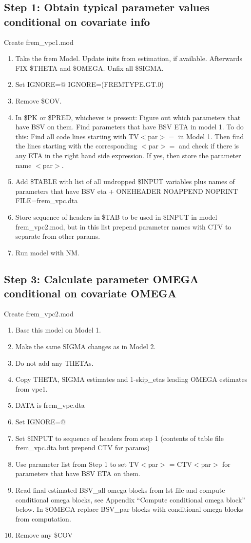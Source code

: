 \subsection{Step 1: Obtain typical parameter values conditional on covariate info}
Create frem\_vpc1.mod

\begin{enumerate}
	\item Take the frem Model. Update inits from estimation, if available. Afterwards FIX \$THETA and \$OMEGA. Unfix all \$SIGMA.
	\item Set IGNORE=@ IGNORE=(FREMTYPE.GT.0)
	\item Remove \$COV.
	\item In \$PK or \$PRED, whichever is present:
Figure out which parameters that have BSV %
on them.
Find parameters
that have BSV ETA %
in model 1.
To do this: Find all code lines starting with TV$<$par$>=$ in Model 1. Then find the lines starting with the corresponding $<$par$>=$ and
check if there is any ETA in the right hand side expression. If yes, then store the parameter name $<$par$>$.
	\item Add \$TABLE with list of all undropped \$INPUT variables plus names of parameters that have BSV eta  + ONEHEADER NOAPPEND NOPRINT FILE=frem\_vpc.dta
	\item Store sequence of headers in \$TAB to be used in \$INPUT in model frem\_vpc2.mod, but in this list prepend parameter names with CTV to separate from other params.
	\item Run model with NM.
\end{enumerate}

\subsection{Step 3:  Calculate parameter OMEGA conditional on covariate OMEGA}
Create frem\_vpc2.mod
\begin{enumerate}
	\item Base this model on Model 1. %
    \item Make the same SIGMA changes as in Model 2.
    \item Do not add any THETAs.
    \item Copy THETA, SIGMA estimates and 1-skip\_etas leading OMEGA estimates from vpc1.
	\item DATA is frem\_vpc.dta
	\item Set IGNORE=@
	\item Set \$INPUT to sequence of headers from step 1 (contents of table file frem\_vpc.dta but prepend CTV for params)
	\item Use parameter list from Step 1 to set TV$<$par$>$ = CTV$<$par$>$ for
parameters that have BSV ETA %
on them.
	\item Read final estimated BSV\_all omega blocks from lst-file and compute conditional omega blocks,
    see Appendix “Compute conditional omega block” below. In \$OMEGA replace BSV\_par blocks with
    conditional omega blocks from computation.
    \item Remove any \$COV
\end{enumerate}

